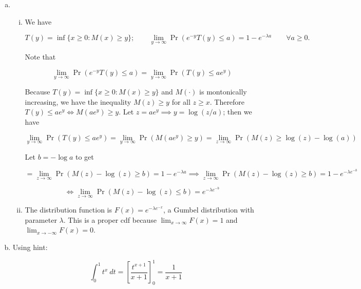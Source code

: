 \begin{solution}

\begin{enumerate}[(a)]

\item 

\begin{enumerate}[(i)]

\item 

We have

\[
T(y) = \inf \{x \geq 0 : M(x) \geq y \}; \qquad \lim_{y \to \infty} \Pr \left( e^{-y} T(y) \leq a \right) = 1 - e^{-\lambda a} \qquad \forall a \geq 0.
\]

Note that

\[
 \lim_{y \to \infty} \Pr \left( e^{-y} T(y) \leq a \right) = \lim_{y \to \infty} \Pr(T(y) \leq a e^y) 
\]

Because \(T(y) = \inf \{x \geq 0 : M(x) \geq y \}\) and \(M(\cdot)\) is montonically increasing, we have the inequality \(M(z) \geq y\) for all \(z \geq x\). Therefore \(T(y) \leq ae^y \iff M(ae^y) \geq y\). Let \(z = ae^y \implies y = \log(z/a)\); then we have

\[
\lim_{y \to \infty} \Pr(T(y) \leq a e^y)  = \lim_{y \to \infty} \Pr( M(ae^y) \geq y)  = \lim_{z \to \infty} \Pr( M(z) \geq \log(z) - \log(a)) 
\]

Let \(b = -\log a\) to get 

\[
= \lim_{z \to \infty} \Pr( M(z) - \log(z) \geq   b) = 1 - e^{-\lambda a} \implies  \lim_{z \to \infty} \Pr( M(z) - \log(z) \geq  b)  = 1 - e^{-\lambda e^{-b}}
\]

\[
 \iff \lim_{z \to \infty} \Pr( M(z) - \log(z) \leq  b)  = e^{-\lambda e^{-b}}
\]



\item The distribution function is \(F(x) = e^{-\lambda e^{-x}}\), a Gumbel distribution with parameter \(\lambda\). This is a proper cdf because \(\lim_{x \to \infty} F(x) = 1\) and \(\lim_{x \to -\infty} F(x) = 0\).

\end{enumerate}

\item 


Using hint:

\[
\int_0^1 t^x  \ dt = \left[ \frac{t^{x+1}}{x+1} \right]_0^1 =  \frac{1}{x+1}
\]


\end{enumerate}
\end{solution}

